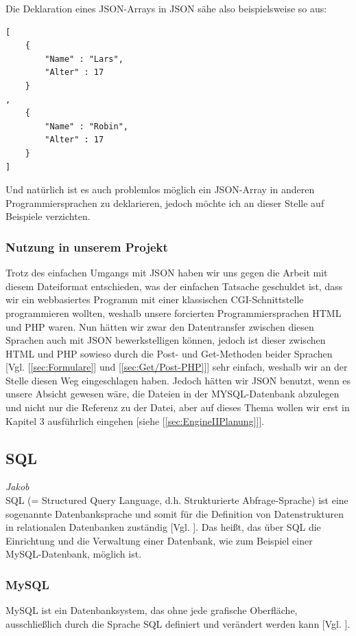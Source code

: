 \documentclass[12pt,a4paper,bibliography=totocnumbered,listof=totocnumbered]{scrartcl}
\begin{document}
\begin{minipage}{\linewidth}
Die Deklaration eines JSON-Arrays in JSON sähe also beispielsweise so aus:
\\
\vspace{1em}
\begin{lstlisting}[caption=Klasse.json, label=lst:json-array]
[
	{
		"Name" : "Lars",
		"Alter" : 17
	}
,
	{
 		"Name" : "Robin",
 		"Alter" : 17
	}
]
\end{lstlisting}

Und natürlich ist es auch problemlos möglich ein JSON-Array in anderen Programmiersprachen zu deklarieren, jedoch möchte ich an dieser Stelle auf Beispiele verzichten.

\subsubsection{Nutzung in unserem Projekt}
Trotz des einfachen Umgangs mit JSON haben wir uns gegen die Arbeit mit diesem Dateiformat entschieden, was der einfachen Tatsache geschuldet ist, dass wir ein webbasiertes Programm mit einer klassischen CGI-Schnittstelle programmieren wollten, weshalb unsere forcierten Programmiersprachen HTML und PHP waren.
Nun hätten wir zwar den Datentransfer zwischen diesen Sprachen auch mit JSON bewerkstelligen können, jedoch ist dieser zwischen HTML und PHP sowieso durch die Post- und Get-Methoden beider Sprachen [Vgl. [\ref{sec:Formulare}] und [\ref{sec:Get/Post-PHP}]] sehr einfach, weshalb wir an der Stelle diesen Weg eingeschlagen haben.
Jedoch hätten wir JSON benutzt, wenn es unsere Absicht gewesen wäre, die Dateien in der MYSQL-Datenbank abzulegen und nicht nur die Referenz zu der Datei, aber auf dieses Thema wollen wir erst in Kapitel 3 ausführlich eingehen [siehe [\ref{sec:EngineIIPlanung}]].

\subsection{SQL}
\label{sec:SQL}
\emph{Jakob}\\
SQL (= Structured Query Language, d.h. Strukturierte Abfrage-Sprache) ist eine sogenannte \glqq Datenbanksprache\grqq{} und somit für die Definition von Datenstrukturen in relationalen Datenbanken zuständig [Vgl. \cite{wiki/SQL}].
Das heißt, das über SQL die Einrichtung und die Verwaltung einer Datenbank, wie zum Beispiel einer MySQL-Datenbank, möglich ist.
\subsubsection{MySQL}
\label{sec:SQLMySQL}
MySQL ist ein Datenbanksystem, das ohne jede grafische Oberfläche, ausschließlich durch die Sprache SQL definiert und verändert werden kann [Vgl. \cite{omkt}].


\end{minipage}
\end{document}
